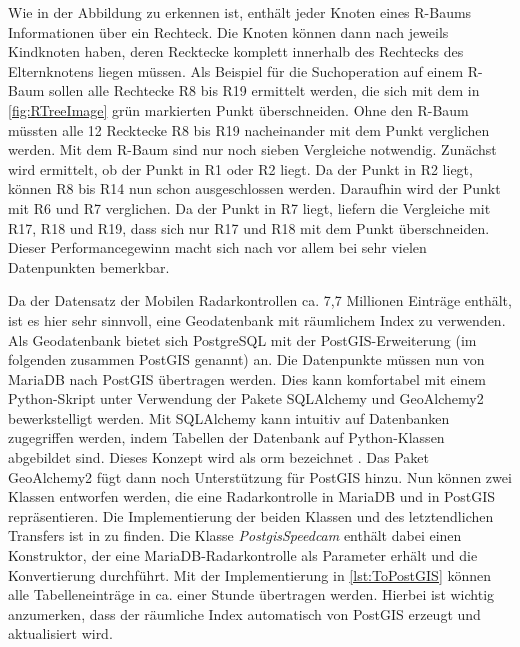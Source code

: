 Wie in der Abbildung zu erkennen ist, enthält jeder Knoten eines R-Baums Informationen über ein Rechteck.
Die Knoten können dann nach \cite{RTrees} jeweils Kindknoten haben, deren Recktecke komplett innerhalb des Rechtecks des Elternknotens liegen müssen.
Als Beispiel für die Suchoperation auf einem R-Baum sollen alle Rechtecke R8 bis R19 ermittelt werden, die sich mit dem in \autoref{fig:RTreeImage} grün markierten Punkt überschneiden.
Ohne den R-Baum müssten alle 12 Recktecke R8 bis R19 nacheinander mit dem Punkt verglichen werden.
Mit dem R-Baum sind nur noch sieben Vergleiche notwendig.
Zunächst wird ermittelt, ob der Punkt in R1 oder R2 liegt.
Da der Punkt in R2 liegt, können R8 bis R14 nun schon ausgeschlossen werden.
Daraufhin wird der Punkt mit R6 und R7 verglichen.
Da der Punkt in R7 liegt, liefern die Vergleiche mit R17, R18 und R19, dass sich nur R17 und R18 mit dem Punkt überschneiden.
Dieser Performancegewinn macht sich nach \cite{RTrees} vor allem bei sehr vielen Datenpunkten bemerkbar.

Da der Datensatz der Mobilen Radarkontrollen ca. 7,7 Millionen Einträge enthält, ist es hier sehr sinnvoll, eine Geodatenbank mit räumlichem Index zu verwenden.
Als Geodatenbank bietet sich PostgreSQL mit der PostGIS-Erweiterung (im folgenden zusammen PostGIS genannt) an.
Die Datenpunkte müssen nun von MariaDB nach PostGIS übertragen werden.
Dies kann komfortabel mit einem Python-Skript unter Verwendung der Pakete SQLAlchemy und GeoAlchemy2 bewerkstelligt werden.
Mit SQLAlchemy kann intuitiv auf Datenbanken zugegriffen werden, indem Tabellen der Datenbank auf Python-Klassen abgebildet sind.
Dieses Konzept wird als \acrfull{orm} bezeichnet \cite{SQLAlchemyKeyFeatures}.
Das Paket GeoAlchemy2 fügt dann noch Unterstützung für PostGIS hinzu.
Nun können zwei Klassen entworfen werden, die eine Radarkontrolle in MariaDB und in PostGIS repräsentieren.
Die Implementierung der beiden Klassen und des letztendlichen Transfers ist in  zu finden.
Die Klasse \emph{PostgisSpeedcam} enthält dabei einen Konstruktor, der eine MariaDB-Radarkontrolle als Parameter erhält und die Konvertierung durchführt.
Mit der Implementierung in \autoref{lst:ToPostGIS} können alle Tabelleneinträge in ca. einer Stunde übertragen werden.
Hierbei ist wichtig anzumerken, dass der räumliche Index automatisch von PostGIS erzeugt und aktualisiert wird.

